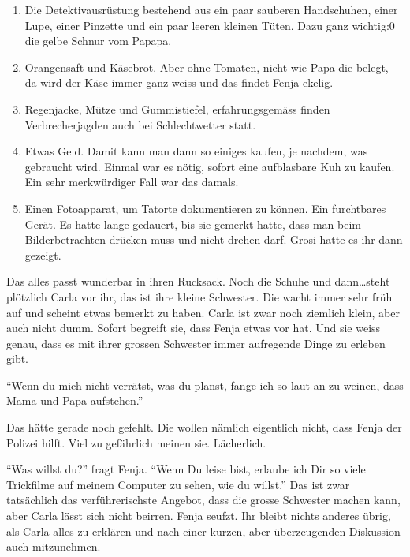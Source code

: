 \begin{enumerate}
  \item Die Detektivausrüstung bestehend aus ein paar sauberen Handschuhen, einer Lupe, einer Pinzette und ein paar leeren kleinen Tüten. Dazu ganz wichtig:0 die gelbe Schnur vom Papapa.
  \item Orangensaft und Käsebrot. Aber ohne Tomaten, nicht wie Papa die belegt, da wird der Käse immer ganz weiss und das findet Fenja ekelig.
  \item Regenjacke, Mütze und Gummistiefel, erfahrungsgemäss finden Verbrecherjagden auch bei Schlechtwetter statt.
  \item Etwas Geld. Damit kann man dann so einiges kaufen, je nachdem, was gebraucht wird. Einmal war es nötig, sofort eine aufblasbare Kuh zu kaufen. Ein sehr merkwürdiger Fall war das damals.
  \item Einen Fotoapparat, um Tatorte dokumentieren zu können. Ein furchtbares Gerät. Es hatte lange gedauert, bis sie gemerkt hatte, dass man beim Bilderbetrachten drücken muss und nicht drehen darf. Grosi hatte es ihr dann gezeigt.
\end{enumerate}

Das alles passt wunderbar in ihren Rucksack. Noch die Schuhe und dann\dots steht plötzlich Carla vor ihr, das ist ihre kleine Schwester. Die wacht immer sehr früh auf und scheint etwas bemerkt zu haben. Carla ist zwar noch ziemlich klein, aber auch nicht dumm. Sofort begreift sie, dass Fenja etwas vor hat. Und sie weiss genau, dass es mit ihrer grossen Schwester immer aufregende Dinge zu erleben gibt.

\enquote{Wenn du mich nicht verrätst, was du planst, fange ich so laut an zu weinen, dass Mama und Papa aufstehen.}

Das hätte gerade noch gefehlt. Die wollen nämlich eigentlich nicht, dass Fenja der Polizei hilft. Viel zu gefährlich meinen sie. Lächerlich. 

\enquote{Was willst du?} fragt Fenja. \enquote{Wenn Du leise bist, erlaube ich Dir so viele Trickfilme auf meinem Computer zu sehen, wie du willst.} Das ist zwar tatsächlich das verführerischste Angebot, dass die grosse Schwester machen kann, aber Carla lässt sich nicht beirren. Fenja seufzt. Ihr bleibt nichts anderes übrig, als Carla alles zu erklären und nach einer kurzen, aber überzeugenden Diskussion auch mitzunehmen. 

